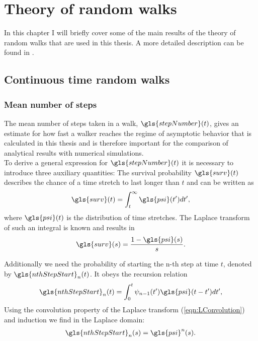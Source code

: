 \section{Theory of random walks} \label{sec:theory}
 
In this chapter I will briefly cover some of the main results of the theory of random walks that are used in this thesis. A more detailed description can be found in \cite{firstSteps}.


\subsection{Continuous time random walks}

\subsubsection{Mean number of steps}

The mean number of steps taken in a walk, $\gls{stepNumber}(t)$, gives an estimate for how fast a walker reaches the regime of asymptotic behavior that is calculated in this thesis and is therefore important for the comparison of analytical results with numerical simulations.\\
To derive a general expression for $\gls{stepNumber}(t)$ it is necessary to introduce three auxiliary quantities: The survival probability $\gls{surv}(t)$ describes the chance of a time stretch to last longer than $t$ and can be written as
%
\begin{align}
\gls{surv}(t) = \int_{t}^{\infty} \gls{psi}(t') dt' ,
\end{align}
%
where $\gls{psi}(t)$ is the distribution of time stretches. The Laplace transform of such an integral is known and results in 
%
\begin{align}
\gls{surv}(s) = \frac{1-\gls{psi}(s)}{s} \label{eqn:surv}.
\end{align}

Additionally we need the probability of starting the n-th step at time $t$, denoted by $\gls{nthStepStart}_{n}(t)$. It obeys the recursion relation
%
\begin{align}
\gls{nthStepStart}_{n}(t) = \int_{0}^{t} \psi_{n-1}(t') \gls{psi}(t-t') dt' ,
\end{align}
%
Using the convolution property of the Laplace transform (\ref{eqn:LConvolution}) and induction we find in the Laplace domain:
%
\begin{align}
\gls{nthStepStart}_n(s) = \gls{psi}^{n}(s) \label{eqn:nthStepStart}.
\end{align}

